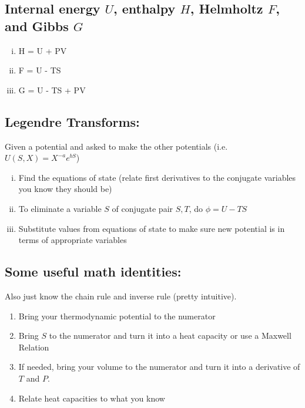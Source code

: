 \documentclass[12pt]{article}
\begin{document}
\subsection{Internal energy $U$, enthalpy $H$, Helmholtz $F$, and Gibbs $G$}
\begin{enumerate}[(i)]
\item H = U + PV
\item F = U - TS
\item G = U - TS + PV
\end{enumerate}
\subsection{Legendre Transforms:}
Given a potential and asked to make the other potentials (i.e. $U(S,X) = X^{-a}e^{bS}$)
\begin{enumerate}[(i)]
\item Find the equations of state (relate first derivatives to the conjugate variables you know they should be)
\item To eliminate a variable $S$ of conjugate pair $S,T$, do $\phi= U-TS$
\item Substitute values from equations of state to make sure new potential is in terms of appropriate variables
\end{enumerate}
%
\subsection{Some useful math identities:}
\eqs{}
\eqe
\eqs {}
\eqe
Also just know the chain rule and inverse rule (pretty intuitive). \\ 

\begin{enumerate}[1.]
\item Bring your thermodynamic potential to the numerator
\item Bring $S$ to the numerator and turn it into a heat capacity or use a Maxwell Relation
\item If needed, bring your volume to the numerator and turn it into a derivative of $T$ and $P$.
\item Relate heat capacities to what you know
\end{enumerate}
\end{document}
